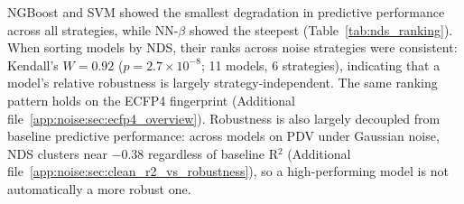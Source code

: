 
NGBoost and SVM showed the smallest degradation in predictive performance across all strategies, while NN-$\beta$ showed the steepest (Table~\ref{tab:nds_ranking}). When sorting models by NDS, their ranks across noise strategies were consistent: Kendall's $W = 0.92$ ($p = 2.7 \times 10^{-8}$; 11 models, 6 strategies), indicating that a model's relative robustness is largely strategy-independent. The same ranking pattern holds on the ECFP4 fingerprint (Additional file~\ref{app:noise:sec:ecfp4_overview}). Robustness is also largely decoupled from baseline predictive performance: across models on PDV under Gaussian noise, NDS clusters near $-0.38$ regardless of baseline R$^2$ (Additional file~\ref{app:noise:sec:clean_r2_vs_robustness}), so a high-performing model is not automatically a more robust one.

